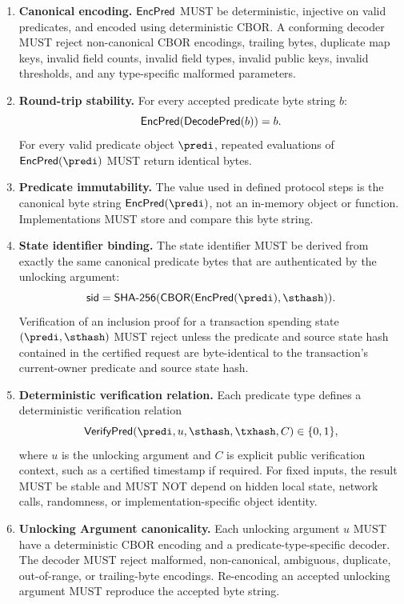 \begin{enumerate}
  \item \textbf{Canonical encoding.}
    $\mathsf{EncPred}$ MUST be deterministic, injective on valid predicates, and encoded using deterministic CBOR. A conforming decoder MUST reject non-canonical CBOR encodings, trailing bytes, duplicate map keys, invalid field counts, invalid field types, invalid public keys, invalid thresholds, and any type-specific malformed parameters.

  \item \textbf{Round-trip stability.}
    For every accepted predicate byte string $b$:
    \[
      \mathsf{EncPred}(\mathsf{DecodePred}(b)) = b.
    \]
    For every valid predicate object $\predi$, repeated evaluations of $\encpred(\predi)$ MUST return identical bytes.

  \item \textbf{Predicate immutability.}
    The value used in defined protocol steps is the canonical byte string $\encpred(\predi)$, not an in-memory object or function. Implementations MUST store and compare this byte string.

    \item \textbf{State identifier binding.}
    The state identifier MUST be derived from exactly the same canonical predicate bytes that are authenticated by the unlocking argument:
    \[
      \mathsf{sid} =
      \mathsf{SHA\text{-}256}(
        \mathsf{CBOR}(\encpred(\predi), \sthash)
      ).
    \]
    Verification of an inclusion proof for a transaction spending state $(\predi,\sthash)$ MUST reject unless the predicate and source state
  hash contained in the certified request are byte-identical to the transaction's current-owner predicate and source state hash.

    \item \textbf{Deterministic verification relation.}
    Each predicate type defines a deterministic verification relation
    \[
      \mathsf{VerifyPred}(\predi, u, \sthash, \txhash, C) \in \{0,1\},
    \]
    where $u$ is the unlocking argument and $C$ is explicit public verification context, such as a certified timestamp if required. For fixed inputs, the result MUST be stable and MUST NOT depend on hidden local state, network calls, randomness, or implementation-specific
  object identity.



    \item \textbf{Unlocking Argument canonicality.}
    Each unlocking argument $u$ MUST have a deterministic CBOR encoding and a predicate-type-specific decoder. The decoder MUST reject malformed, non-canonical, ambiguous, duplicate, out-of-range, or trailing-byte encodings. Re-encoding an accepted unlocking argument MUST reproduce the accepted byte string.


\end{enumerate}

